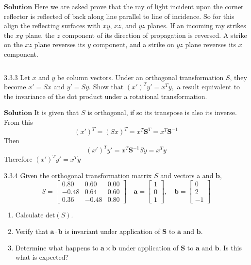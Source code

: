 $\boxed{\textbf{Solution}}$ Here we are asked prove that the ray of light incident upon the corner reflector is reflected of back along line parallel to line of incidence.
So for this align the reflecting surfaces with $xy$, $xz$, and $yz$ planes. If an incoming ray strikes the $xy$ plane, the $z$ component of its direction of propagation is reversed. A strike on the $xz$ plane
reverses its $y$ component, and a strike on $yz$ plane reverses its $x$ component.

$$$$

\begin{mybox}{3.3.3}
Let $x$ and $y$ be column vectors. Under an orthogonal transformation $S$, they become
$x'=S x$ and $y'=S y .$ Show that $\left(x'\right)^{T} y'=x^{T} y,$ a result equivalent to the invariance of the dot product under a rotational transformation.
\end{mybox}

$\boxed{\textbf{Solution}}$ It is given that $S$ is orthogonal, if so its transpose is also its inverse.
From this
$$
\left(x'\right)^{T}=(S x)^{T}=x^{T} \mathbf{S}^{T}=x^{T} \mathbf{S}^{-1}
$$
Then
$$
\left(x'\right)^{T} y'=x^{T} \mathbf{S}^{-1} S y=x^{T} y
$$
Therefore $\left(x'\right)^{T} y'=x^{T} y$


\newpage


\begin{mybox}{3.3.4}
Given the orthogonal transformation matrix $S$ and vectors a and $\mathbf{b}$, 
$$S=\begin{bmatrix}{0.80} & {0.60} & {0.00} \\ {-0.48} & {0.64} & {0.60} \\ {0.36} & {-0.48} & {0.80}\end{bmatrix} \quad \mathbf{a}=\begin{bmatrix}{1} \\ {0} \\ {1}\end{bmatrix}, \quad \mathbf{b}=\begin{bmatrix}{0} \\ {2} \\ {-1}\end{bmatrix}$$
\begin{enumerate}[$(a)$]
\item Calculate $\text{det}(S)$.
\item Verify that $\mathbf{a}\cdot \mathbf{b}$ is invariant under application of $\mathbf{S}$ to $\mathbf{a}$ and $\mathbf{b}$.
\item Determine what happens to $\mathbf{a}\times \mathbf{b}$ under application of $\mathbf{S}$ to $\mathbf{a}$ and $\mathbf{b}$. Is this what is expected?
\end{enumerate}
\end{mybox}

